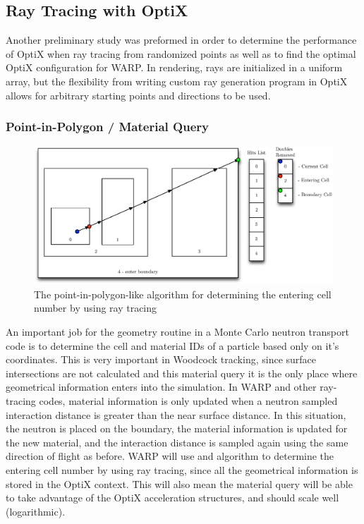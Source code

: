 \subsection{Ray Tracing with OptiX}

Another preliminary study was preformed in order to determine the performance of OptiX when ray tracing from randomized points as well as to find the optimal OptiX configuration for WARP.  In rendering, rays are initialized in a uniform array, but the flexibility from writing custom ray generation program in OptiX allows for arbitrary starting points and directions to be used.

\subsubsection{Point-in-Polygon / Material Query}

\begin{figure}[h!] 
  \centering
    \includegraphics[width=1.0\textwidth]{graphics/whereami.eps}
     \caption{The point-in-polygon-like algorithm for determining the entering cell number by using ray tracing \label{whereami} }
\end{figure}

An important job for the geometry routine in a Monte Carlo neutron transport code is to determine the cell and material IDs of a particle based only on it's coordinates.  This is very important in Woodcock tracking, since surface intersections are not calculated and this material query it is the only place where geometrical information enters into the simulation.  In WARP and other ray-tracing codes, material information is only updated when a neutron sampled interaction distance is greater than the near surface distance.  In this situation, the neutron is placed on the boundary, the material information is updated for the new material, and the interaction distance is sampled again using the same direction of flight as before.  WARP will use and algorithm to determine the entering cell number by using ray tracing, since all the geometrical information is stored in the OptiX context.  This will also mean the material query will be able to take advantage of the OptiX acceleration structures, and should scale well (logarithmic).

